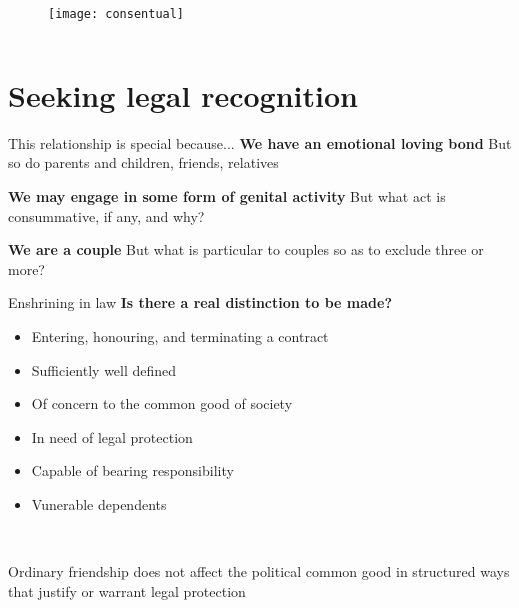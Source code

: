 \documentclass[xcolor=dvipsnames]{beamer}
\begin{document}
\begin{frame}[plain]
  \begin{columns}[T] %
    \begin{column}{0.9\textwidth}
      \begin{figure}[H]
        \centering
        \texttt{[image: consentual]}
      \end{figure}
    \end{column}%
  \end{columns}
\end{frame}


\section{Seeking legal recognition}


\begin{frame}{This relationship is special because...}
\textbf{We have an emotional loving bond}\newline
But so do parents and children, friends, relatives \vspace{10mm}

\textbf{We may engage in some form of genital activity}\newline
But what act is consummative, if any, and why? \vspace{10mm}

\textbf{We are a couple}\newline
But what is particular to couples so as to exclude three or more? \vspace{10mm}
\end{frame}


\begin{frame}{Enshrining in law}
  \textbf{Is there a real distinction to be made?}\newline
\begin{itemize}
\item Entering, honouring, and terminating a contract
\item Sufficiently well defined
\item Of concern to the common good of society
\item In need of legal protection
\item Capable of bearing responsibility
\item Vunerable dependents
\end{itemize}

~

Ordinary friendship does not affect the political common good in structured ways that justify or warrant legal protection
\end{frame}
\end{document}
